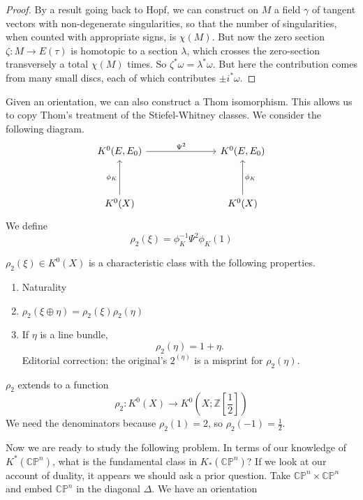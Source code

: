 \documentclass[../main]{subfiles}
\begin{document}
\begin{proof}
By a result going back to Hopf, we can construct on $M$ a field $\gamma$ of tangent vectors with non-degenerate singularities, so that the number of singularities, when counted with appropriate signs, is $\chi(M)$. But now the zero section $\zeta:M\longrightarrow E(\tau)$ is homotopic to a section $\lambda$, which crosses the zero-section transversely a total $\chi(M)$ times. So $\zeta^\ast \omega=\lambda^\ast \omega$. But here the contribution comes from many small discs, each of which contributes $\pm i^\ast \omega$.
\end{proof}
\par Given an orientation, we can also construct a Thom isomorphism. This allows us to copy Thom's treatment of the Stiefel-Whitney classes. We consider the following diagram.
\[\begin{tikzcd}
	K^0(E,E_0) &&& K^0(E,E_0) \\
	\\
	K^0(X) &&& K^0(X)
	\arrow["\phi_K", from=3-1, to=1-1]
	\arrow["\phi_K"', from=3-4, to=1-4]
	\arrow["\Psi^2", from=1-1, to=1-4]
\end{tikzcd}\]
We define 
\[\rho_2(\xi)=\phi_K^{-1}\Psi^2\phi_K(1)\]
\begin{proposition}\label{prop:p3ch11.5}
$\rho_2(\xi)\in K^0(X)$ is a characteristic class with the following properties.
\begin{enumerate}
    \item Naturality
    \item $\rho_2(\xi\oplus\eta)=\rho_2(\xi)\rho_2(\eta)$
    \item If $\eta$ is a line bundle,
    \[\rho_2(\eta)=1+\eta.\]
    Editorial correction: the original's $2^{(\eta)}$ is a misprint for $\rho_2(\eta)$.
\end{enumerate}
\end{proposition}
\begin{proposition}\label{prop:p3ch11.6}
$\rho_2$ extends to a function
\[\rho_2:K^0(X)\longrightarrow K^0\left(X;\mathbb{Z}\left[\frac{1}{2}\right]\right)\]
We need the denominators because $\rho_2(1)=2$, so $\rho_2(-1)=\frac{1}{2}$.
\end{proposition}
\par Now we are ready to study the following problem. In terms of our knowledge of $K^\ast (\mathbb{CP}^n)$, what is the fundamental class in $K_\ast (\mathbb{CP}^n)$? If we look at our account of duality, it appears we should ask a prior question. Take $\mathbb{CP}^n\times\mathbb{CP}^n$ and embed $\mathbb{CP}^n$ in the diagonal $\Delta$. We have an orientation 
\end{document}
